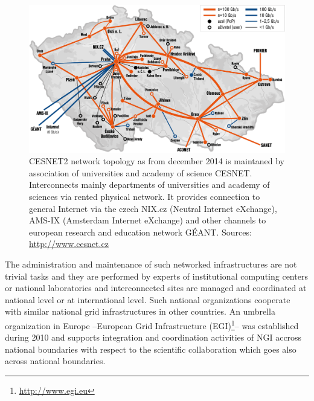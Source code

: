 \begin{figure}[ht]
    \centering
    \includegraphics[width=1\textwidth]{chapter2/cesnet2-topo1.png}
    \caption{CESNET2 network topology as from december 2014 is maintaned by association of universities and academy of science CESNET. Interconnects mainly departments of universities and academy of sciences via rented physical network. It provides connection to general Internet via the czech NIX.cz (Neutral Internet eXchange), AMS-IX (Amsterdam Internet eXchange) and other channels to european research and education network GÉANT. Sources: \url{http://www.cesnet.cz}}
    \label{fig:cesnet}
\end{figure}

The administration and maintenance of such networked infrastructures are not trivial tasks and they are performed by experts of institutional computing centers or national laboratories and interconnected sites are managed and coordinated at national level or at international level. Such national organizations cooperate with similar national grid infrastructures in other countries. An umbrella organization in Europe --European Grid Infrastructure (EGI)\footnote{\url{http://www.egi.eu}}-- was established during 2010 and supports integration and coordination activities of NGI accross national boundaries with respect to the scientific collaboration which goes also across national boundaries. 

